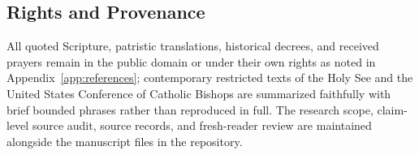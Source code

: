 \subsection{Rights and Provenance}

All quoted Scripture, patristic translations, historical decrees, and received
prayers remain in the public domain or under their own rights as noted in
Appendix~\ref{app:references}; contemporary restricted texts of the Holy See
and the United States Conference of Catholic Bishops are summarized faithfully
with brief bounded phrases rather than reproduced in full. The
research scope, claim-level source audit, source records, and fresh-reader
review are maintained alongside the manuscript files in the repository.
